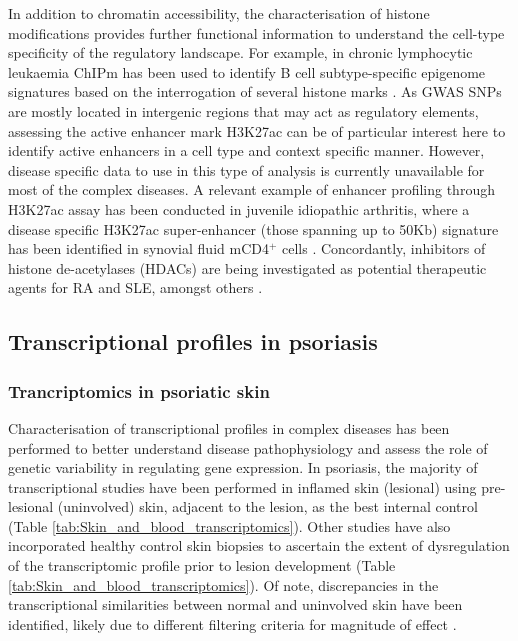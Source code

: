 In addition to chromatin accessibility, the characterisation of histone modifications provides further functional information to understand the cell-type specificity of the regulatory landscape. For example, in chronic lymphocytic leukaemia ChIPm has been used to identify B cell subtype-specific epigenome signatures based on the interrogation of several histone marks \parencite{Rendeiro2016}. As GWAS SNPs are mostly located in intergenic regions that may act as regulatory elements, assessing the active enhancer mark H3K27ac can be of particular interest here to identify active enhancers in a cell type and context specific manner. %
However, disease specific data to use in this type of analysis is currently unavailable for most of the complex diseases. A relevant example of enhancer profiling through H3K27ac assay has been conducted in juvenile idiopathic arthritis, where a disease specific H3K27ac super-enhancer (those spanning up to 50Kb) signature has been identified in synovial fluid mCD4$^+$ cells \parencite{Peeters2015}. Concordantly, inhibitors of histone de-acetylases (HDACs) are being investigated as potential therapeutic agents for RA and SLE, amongst others \parencite{Hsieh2014,Shu2017}.




\subsection{Transcriptional profiles in psoriasis}

\subsubsection{Trancriptomics in psoriatic skin}
Characterisation of transcriptional profiles in complex diseases has been performed to better understand disease pathophysiology and assess the role of genetic variability in regulating gene expression. In psoriasis, the majority of transcriptional studies have been performed in inflamed skin (lesional) using pre-lesional (uninvolved) skin, adjacent to the lesion, as the best internal control (Table \ref{tab:Skin_and_blood_transcriptomics}). Other studies have also incorporated healthy control skin biopsies to ascertain the extent of dysregulation of the transcriptomic profile prior to lesion development (Table \ref{tab:Skin_and_blood_transcriptomics}). Of note, discrepancies in the transcriptional similarities between normal and uninvolved skin have been identified, likely due to different filtering criteria for magnitude of effect \parencite{Keermann2015, Tsoi2015}.%

